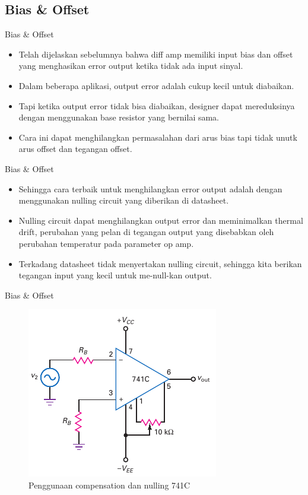 \subsection{Bias \& Offset}

\begin{frame}{Bias \& Offset}
	\begin{itemize}
		\item Telah dijelaskan sebelumnya bahwa diff amp memiliki input bias dan offset yang menghasikan error output ketika tidak ada input sinyal.
		\item Dalam beberapa aplikasi, output error adalah cukup kecil untuk diabaikan.
		\item Tapi ketika output error tidak bisa diabaikan, designer dapat mereduksinya dengan menggunakan base resistor yang bernilai sama.
		\item Cara ini dapat menghilangkan permasalahan dari arus bias tapi tidak unutk arus offset dan tegangan offset.	
	\end{itemize}
\end{frame}

\begin{frame}{Bias \& Offset}
	\begin{itemize}
		\item Sehingga cara terbaik untuk menghilangkan error output adalah dengan menggunakan nulling circuit yang diberikan di datasheet.
		\item Nulling circuit dapat menghilangkan output error dan meminimalkan thermal drift, perubahan yang pelan di tegangan output yang disebabkan oleh perubahan temperatur pada parameter op amp.
		\item Terkadang datasheet tidak menyertakan nulling circuit, sehingga kita berikan tegangan input yang kecil untuk me-null-kan output.
	\end{itemize}
\end{frame}

\begin{frame}{Bias \& Offset}
	\begin{figure}
		\centering
		\includegraphics[height=0.7\textheight]{gambar/fig-16.06}
		\caption{Penggunaan compensation dan nulling 741C}
		\label{fig-16.06}
	\end{figure}
\end{frame}

